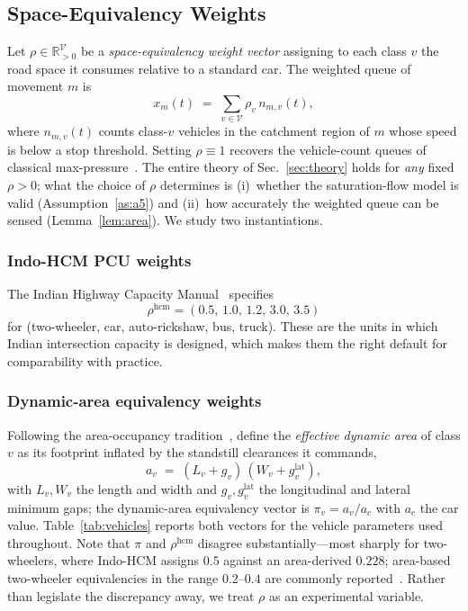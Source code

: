 \documentclass[journal]{IEEEtran}
\newcommand{\vc}{\mathcal{V}}
\begin{document}
\subsection{Space-Equivalency Weights}
\label{subsec:weights}
Let $\rho \in \mathbb{R}^{\vc}_{>0}$ be a \emph{space-equivalency weight
vector} assigning to each class $v$ the road space it consumes relative
to a standard car. The weighted queue of movement $m$ is
\begin{equation}
x_m(t) \;=\; \sum_{v\in\vc} \rho_v\, n_{m,v}(t),
\label{eq:xdef}
\end{equation}
where $n_{m,v}(t)$ counts class-$v$ vehicles in the catchment region of
$m$ whose speed is below a stop threshold. Setting $\rho \equiv 1$
recovers the vehicle-count queues of classical
max-pressure~\cite{b_varaiya}. The entire theory of
Sec.~\ref{sec:theory} holds for \emph{any} fixed $\rho > 0$; what the
choice of $\rho$ determines is (i)~whether the saturation-flow model is
valid (Assumption~\ref{as:a5}) and (ii)~how accurately the weighted queue
can be sensed (Lemma~\ref{lem:area}). We study two instantiations.

\subsubsection{Indo-HCM PCU weights} The Indian Highway Capacity
Manual~\cite{b_indohcm} specifies
\begin{equation}
\rho^{\mathrm{hcm}} = (0.5,\,1.0,\,1.2,\,3.0,\,3.5)
\label{eq:pcu}
\end{equation}
for (two-wheeler, car, auto-rickshaw, bus, truck). These are the units in
which Indian intersection capacity is designed, which makes them the
right default for comparability with practice.

\subsubsection{Dynamic-area equivalency weights} Following the
area-occupancy tradition~\cite{b_mallikarjuna,b_chandra,b_biswas}, define
the \emph{effective dynamic area} of class $v$ as its footprint inflated
by the standstill clearances it commands,
\begin{equation}
a_v \;=\; (L_v + g_v)\,(W_v + g^{\mathrm{lat}}_v),
\label{eq:areadef}
\end{equation}
with $L_v,W_v$ the length and width and $g_v, g^{\mathrm{lat}}_v$ the
longitudinal and lateral minimum gaps; the dynamic-area equivalency
vector is $\pi_v = a_v / a_c$ with $a_c$ the car value.
Table~\ref{tab:vehicles} reports both vectors for the vehicle parameters
used throughout. Note that $\pi$ and $\rho^{\mathrm{hcm}}$ disagree
substantially---most sharply for two-wheelers, where Indo-HCM assigns
$0.5$ against an area-derived $0.228$; area-based two-wheeler
equivalencies in the range $0.2$--$0.4$ are commonly
reported~\cite{b_chandra,b_biswas}. Rather than legislate the
discrepancy away, we treat $\rho$ as an experimental variable.
\end{document}
